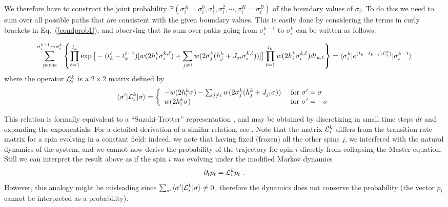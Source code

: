 \documentclass[aps,twocolumn,floats,pre,amsmath,superscriptaddress]{revtex4}
\newcommand{\beq}{\begin{equation}}
\newcommand{\eeq}{\end{equation}}
\def\to{\rightarrow} \def\la{\langle} \def\ra{\rangle}
\newcommand{\bra}[1]{\langle{#1}|}
\newcommand{\ket}[1]{|{#1}\rangle{}}
\newcommand{\<}{\langle}
\renewcommand{\>}{\rangle}
\begin{document}
We therefore have to construct the joint probability 
$\mathbb{P}(\sigma^A_{i}=\sigma^0_i, \sigma_i^{1}, \sigma_i^{2}, \cdots, \sigma_i^{K}=\sigma^B_{i})$
of the boundary values of $\sigma_i$.
To do this we need to sum over all possible paths that are consistent with the given boundary values.
This is easily done by considering the terms in curly brackets in Eq.~(\ref{condprob1}), and observing that
its sum over paths going from $\sigma_i^{k-1}$ to $\sigma_i^k$ can be written as follows:
\begin{widetext}
\beq
\sum_{\text{paths}}^{\sigma_i^{k-1} \to \sigma_i^k} \left\{ \prod_{\ell=1}^{l_k} \exp\big[ -(t^{\ell}_k-t^{\ell-1}_{k})
[ w(2 h_i^k \sigma_i^{k,\ell}) + \sum_{j\neq i} w(2  \sigma_j^{k}(\bar h_{j}^{k} + J_{ji} \sigma^{k,\ell}_i))]
\big]
\prod_{\ell=1}^{l_k}w(2h_i^k \sigma_i^{k,\ell}) dt_{k,\ell} \right\}= 
\bra{\sigma_i^k} e^{(t_k-t_{k-1}) {\cal L}_i^k)}
\ket{\sigma_i^{k-1}}
\eeq
where the operator ${\cal L}^k_i$ is a $2\times2$ matrix defined by
\beq
\bra{\sigma'} {\cal L}^k_i \ket{\sigma} = 
\left\{
\begin{array}{ll}
   -w(2 h_i^k \sigma) - \sum_{j\neq i} w(2  \sigma_j^{k}(\bar h_{j}^{k} + J_{ji} \sigma ))   
 & \text{ for } \sigma' = \sigma \\
   w(2h_i^k \sigma)                 & \text{            for } \sigma' = -\sigma
\end{array}
\right.
\eeq
\end{widetext}
This relation is formally equivalent to a ``Suzuki-Trotter''
representation \cite{suzukitrotter}, and may be obtained by
discretizing in small time steps $dt$ and expanding the
exponentials. For a detailed derivation of a similar relation, see \cite{francescoprb}.
Note that the matrix ${\cal L}_i^k$ differs from the transition rate matrix for a spin evolving in a constant field:
indeed, we note that having fixed (frozen) all the other spins $j$, we interfered with the natural dynamics of 
the system, and we cannot now derive the probability of the trajectory for spin $i$ directly 
from collapsing the Master equation. 
Still we can interpret the result above as if the spin $i$ was evolving under the modified Markov dynamics
\beq
\partial_t p_t={\cal L}_i^k p_t \ .
\eeq
However, this analogy might be misleading since $\sum_{\sigma'}\bra{\sigma'} {\cal L}^k_i \ket{\sigma}  \neq 0$,
therefore the dynamics does not conserve the probability (the vector
$p_t$ cannot be interpreted as a probability).
\end{document}
